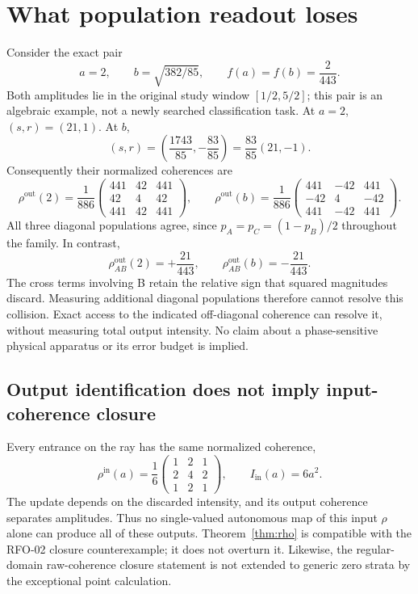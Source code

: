 \documentclass[11pt,a4paper]{article}
\newcommand{\Iin}{I_{\mathrm{in}}}
\newcommand{\rout}{\rho^{\mathrm{out}}}
\begin{document}
\section{What population readout loses}\label{sec:ambiguity}
Consider the exact pair
\begin{equation}
a=2,\qquad b=\sqrt{382/85},\qquad f(a)=f(b)=\frac2{443}.\label{eq:pair}
\end{equation}
Both amplitudes lie in the original study window $[1/2,5/2]$; this pair is an algebraic example, not a newly searched classification task. At $a=2$, $(s,r)=(21,1)$. At $b$,
\begin{equation}
(s,r)=\left(\frac{1743}{85},-\frac{83}{85}\right)
=\frac{83}{85}(21,-1).
\end{equation}
Consequently their normalized coherences are
\begin{equation}
\rout(2)=\frac1{886}\begin{pmatrix}441&42&441\\42&4&42\\441&42&441\end{pmatrix},\qquad
\rout(b)=\frac1{886}\begin{pmatrix}441&-42&441\\-42&4&-42\\441&-42&441\end{pmatrix}.\label{eq:pairrho}
\end{equation}
All three diagonal populations agree, since $p_A=p_C=(1-p_B)/2$ throughout the family. In contrast,
\begin{equation}
\rout_{AB}(2)=+\frac{21}{443},\qquad
\rout_{AB}(b)=-\frac{21}{443}.\label{eq:opposite}
\end{equation}
The cross terms involving B retain the relative sign that squared magnitudes discard. Measuring additional diagonal populations therefore cannot resolve this collision. Exact access to the indicated off-diagonal coherence can resolve it, without measuring total output intensity. No claim about a phase-sensitive physical apparatus or its error budget is implied.

\subsection{Output identification does not imply input-coherence closure}
Every entrance on the ray has the same normalized coherence,
\begin{equation}
\rho^{\mathrm{in}}(a)=\frac16
\begin{pmatrix}1&2&1\\2&4&2\\1&2&1\end{pmatrix},\qquad \Iin(a)=6a^2.\label{eq:inputrho}
\end{equation}
The update depends on the discarded intensity, and its output coherence separates amplitudes. Thus no single-valued autonomous map of this input $\rho$ alone can produce all of these outputs. Theorem~\ref{thm:rho} is compatible with the RFO-02 closure counterexample; it does not overturn it. Likewise, the regular-domain raw-coherence closure statement is not extended to generic zero strata by the exceptional point calculation.
\end{document}
